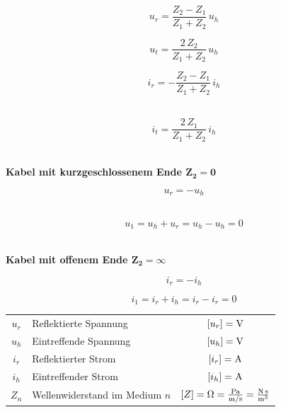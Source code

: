 \begin{minipage}{0.48\linewidth}
$$ \boxed{ u_r = \frac{Z_2 - Z_1}{Z_1 + Z_2} \, u_h } $$
\end{minipage}
\hfill
\begin{minipage}{0.48\linewidth}
$$ \boxed{ u_t = \frac{2 \, Z_2}{Z_1 + Z_2} \, u_h } $$
\end{minipage}


\begin{minipage}{0.48\linewidth}
$$ \boxed{ i_r = -\frac{Z_2 - Z_1}{Z_1 + Z_2} \, i_h } $$ \\
\end{minipage}
\hfill
\begin{minipage}{0.48\linewidth}
$$ \boxed{ i_t = \frac{2 \, Z_1}{Z_1 + Z_2} \, i_h } $$ \\
\end{minipage}

\textbf{Kabel mit kurzgeschlossenem Ende $\boldsymbol{Z_2 = 0}$} \\
\vspace{0.2cm}
\begin{minipage}{0.3\linewidth}
$$ u_r = - u_h $$ \\
\end{minipage}
\hfill
\begin{minipage}{0.68\linewidth}
$$ u_1 = u_h + u_r  = u_h - u_h = 0 $$ \\
\end{minipage}


\textbf{Kabel mit offenem Ende $\boldsymbol{Z_2 = \infty}$} \\
\vspace{0.2cm}
\begin{minipage}{0.3\linewidth}
$$ i_r = - i_h $$ 
\end{minipage}
\hfill
\begin{minipage}{0.68\linewidth}
$$ i_1 = i_r + i_h  = i_r - i_r = 0 $$  
\end{minipage}

\vspace{0.2cm}

\renewcommand{\arraystretch}{1.1}
\begin{tabular}{clc}
$u_r$ & Reflektierte Spannung & $[u_r] = \mathrm{V}$ \\
$u_h$ & Eintreffende Spannung & $[u_h] = \mathrm{V}$ \\
$i_r$ & Reflektierter Strom & $[i_r] = \mathrm{A}$ \\
$i_h$ & Eintreffender Strom & $[i_h] = \mathrm{A}$ \\
$Z_n$ & Wellenwiderstand im Medium $n$ & $[Z] = \mathrm{\Omega} = \frac{\mathrm{Pa}}{\mathrm{m} / \mathrm{s}} = \frac{\mathrm{N} \, \mathrm{s}}{\mathrm{m}^3}$ \\
\end{tabular}
\renewcommand{\arraystretch}{1}




